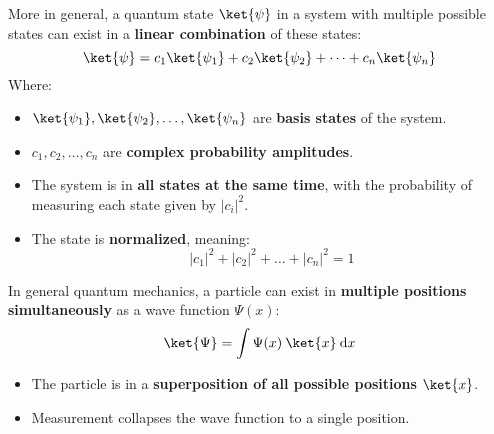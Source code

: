 \highspace
More in general, a quantum state $\ket{\psi}$ in a system with multiple possible states can exist in a \textbf{linear combination} of these states:
\begin{equation*}
    \ket{\psi} = c_{1} \ket{\psi_{1}} + c_{2} \ket{\psi_{2}} + \dots + c_{n} \ket{\psi_{n}}    
\end{equation*}
Where:
\begin{itemize}
    \item $\ket{\psi_{1}}, \ket{\psi_{2}}, \dots, \ket{\psi_{n}}$ are \textbf{basis states} of the system.
    
    \item $c_{1}, c_{2}, \dots, c_{n}$ are \textbf{complex probability amplitudes}.

    \item The system is in \textbf{all states at the same time}, with the probability of measuring each state given by $\left|c_{i}\right|^{2}$.

    \item The state is \textbf{normalized}, meaning:
    \begin{equation*}
        \left|c_{1}\right|^{2} + \left|c_{2}\right|^{2} + \dots + \left|c_{n}\right|^{2} = 1
    \end{equation*}
\end{itemize}

\newpage

\begin{examplebox}
    In general quantum mechanics, a particle can exist in \textbf{multiple positions simultaneously} as a wave function $\Psi(x)$:
    \begin{equation*}
        \ket{\Psi} = \displaystyle\int \Psi(x) \: \ket{x} \: \mathrm{d}x  
    \end{equation*}
    \begin{itemize}
      \item The particle is in a \textbf{superposition of all possible positions} $\ket{x}$.
      \item Measurement collapses the wave function to a single position.
    \end{itemize}
\end{examplebox}

